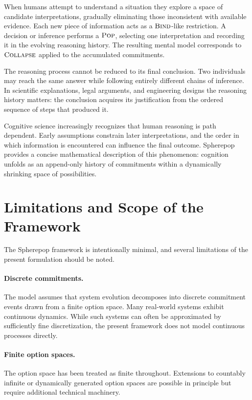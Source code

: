 \documentclass[12pt]{article}
\newcommand{\Pop}{\operatorname{\textsc{Pop}}}
\newcommand{\Bind}{\operatorname{\textsc{Bind}}}
\newcommand{\Collapse}{\operatorname{\textsc{Collapse}}}
\begin{document}
When humans attempt to understand a situation they explore a space of candidate interpretations, gradually eliminating those inconsistent with available evidence. Each new piece of information acts as a $\Bind$-like restriction. A decision or inference performs a $\Pop$, selecting one interpretation and recording it in the evolving reasoning history. The resulting mental model corresponds to $\Collapse$ applied to the accumulated commitments.

The reasoning process cannot be reduced to its final conclusion. Two individuals may reach the same answer while following entirely different chains of inference. In scientific explanations, legal arguments, and engineering designs the reasoning history matters: the conclusion acquires its justification from the ordered sequence of steps that produced it.

Cognitive science increasingly recognizes that human reasoning is path dependent. Early assumptions constrain later interpretations, and the order in which information is encountered can influence the final outcome. Spherepop provides a concise mathematical description of this phenomenon: cognition unfolds as an append-only history of commitments within a dynamically shrinking space of possibilities.

\section{Limitations and Scope of the Framework}
\label{sec:limitations}

The Spherepop framework is intentionally minimal, and several limitations of the present formulation should be noted.

\paragraph{Discrete commitments.} The model assumes that system evolution decomposes into discrete commitment events drawn from a finite option space. Many real-world systems exhibit continuous dynamics. While such systems can often be approximated by sufficiently fine discretization, the present framework does not model continuous processes directly.

\paragraph{Finite option spaces.} The option space has been treated as finite throughout. Extensions to countably infinite or dynamically generated option spaces are possible in principle but require additional technical machinery.
\end{document}
